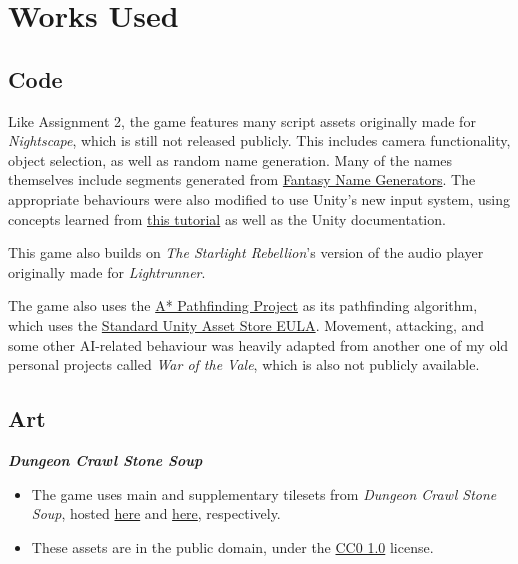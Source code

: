 \documentclass[10pt]{article}
\begin{document}



\section{Works Used}


\subsection{Code}

Like Assignment 2, the game features many script assets originally made for \textit{Nightscape},
which is still not released publicly. This includes camera functionality, object selection, as well as
random name generation. Many of the names themselves include segments generated from
\href{https://www.fantasynamegenerators.com/}{Fantasy Name Generators}.
The appropriate behaviours were also modified to use Unity's new input system, using concepts learned
from \href{https://www.youtube.com/watch?v=PsAbHoB85hM}{this tutorial} as well as the Unity documentation.

This game also builds on \textit{The Starlight Rebellion}'s version of the audio player originally made
for \textit{Lightrunner}.

The game also uses the \href{https://arongranberg.com/astar/}{A* Pathfinding Project} as its pathfinding algorithm,
which uses the \href{https://unity3d.com/legal/as_terms}{Standard Unity Asset Store EULA}. Movement, attacking,
and some other AI-related behaviour was heavily adapted from another one of my old personal projects called \textit{War of the Vale},
which is also not publicly available.

\subsection{Art}

\textbf{\textit{Dungeon Crawl Stone Soup}}
\begin{itemize}
    \item The game uses main and supplementary tilesets from \textit{Dungeon Crawl Stone Soup}, hosted \href{https://opengameart.org/content/dungeon-crawl-32x32-tiles}{here}
        and \href{https://opengameart.org/content/dungeon-crawl-32x32-tiles-supplemental}{here}, respectively.
    \item These assets are in the public domain, under the \href{https://creativecommons.org/publicdomain/zero/1.0/}{CC0 1.0} license.
\end{itemize}
\end{document}
